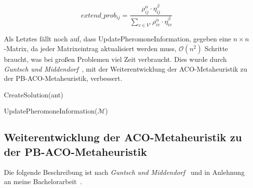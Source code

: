 \documentclass[fontsize=12, a4aper]{scrartcl}
\begin{document}
	\begin{equation} \label{subsec:ACO_-_Metaheuristik_Nach:eq:Extended_Probabilistik_Rule}
		extend\_prob_{ij} = \frac{\rho_{ij}^{\alpha} \cdot \eta_{ij}^{\beta}}{\sum\limits_{v \in V'} \rho_{iv}^{\alpha} \cdot \eta_{iv}^{\beta}}
	\end{equation}
	
	Als Letztes fällt noch auf, dass \glqq UpdatePheromoneInformation\grqq{}, gegeben eine \(n \times n\)-Matrix, da jeder Matrixeintrag aktualisiert werden muss, \(\mathcal{O}(n^2)\) Schritte braucht, was bei großen Problemen viel Zeit verbraucht. Dies wurde durch \textit{Guntsch und Middendorf}~\cite{guntsch2002population}, mit der Weiterentwicklung der ACO-Metaheuristik zu der PB-ACO-Metaheuristik, verbessert.
	
	\begin{algorithm}
		
		\caption{ACO-Metaheuristik angewandt auf das TSP}\label{subsec:ACO_Metaheuristik:alg:ACO}
		
		\begin{algorithmic}[1]
			
			\Repeat
			
				
					\State CreateSolution(ant)
				
				\EndFor
				
				\State UpdatePheromoneInformation(\(\mathcal{M}\))
			
			
		\end{algorithmic}
		
	\end{algorithm}
	
	\subsection{Weiterentwicklung der ACO-Metaheuristik zu der PB-ACO-Metaheuristik} \label{subsec:Weiterentwicklung_Der_ACO_Metaheuristik_Zu_Der_P_-_ACO_Metaheuristik}
	
	Die folgende Beschreibung ist nach \textit{Guntsch und Middendorf}~\cite{guntsch2002population} und in Anlehnung an meine Bachelorarbeit~\cite{FCM_2019}.\hfill\newline
	
\end{document}

